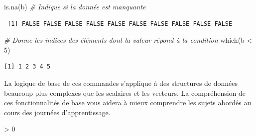 \documentclass[
  12pt,
]{book}
\newenvironment{Shaded}{\begin{snugshade}}{\end{snugshade}}
\newcommand{\CommentTok}[1]{\textcolor[rgb]{0.56,0.35,0.01}{\textit{#1}}}
\newcommand{\DecValTok}[1]{\textcolor[rgb]{0.00,0.00,0.81}{#1}}
\newcommand{\FunctionTok}[1]{\textcolor[rgb]{0.00,0.00,0.00}{#1}}
\newcommand{\NormalTok}[1]{#1}
\newcommand{\SpecialCharTok}[1]{\textcolor[rgb]{0.00,0.00,0.00}{#1}}
\newlength{\cslhangindent}
\newenvironment{CSLReferences}[2] %
 {%
  \setlength{\parindent}{0pt}
  \ifodd #1 \everypar{\setlength{\hangindent}{\cslhangindent}}\ignorespaces\fi
  \ifnum #2 > 0
  \setlength{\parskip}{#2\baselineskip}
  \fi
 }%
 {}
\begin{document}
\begin{Shaded}
\begin{Highlighting}[]
\FunctionTok{is.na}\NormalTok{(b) }\CommentTok{\# Indique si la donnée est manquante}
\end{Highlighting}
\end{Shaded}

\begin{verbatim}
 [1] FALSE FALSE FALSE FALSE FALSE FALSE FALSE FALSE FALSE FALSE
\end{verbatim}

\begin{Shaded}
\begin{Highlighting}[]
\CommentTok{\# Donne les indices des éléments dont la valeur répond à la condition}
\FunctionTok{which}\NormalTok{(b }\SpecialCharTok{\textless{}} \DecValTok{5}\NormalTok{)}
\end{Highlighting}
\end{Shaded}

\begin{verbatim}
[1] 1 2 3 4 5
\end{verbatim}

La logique de base de ces commandes s'applique à des structures de données beaucoup plus complexes que les scalaires et les vecteurs. La compréhension de ces fonctionnalités de base vous aidera à mieux comprendre les sujets abordés au cours des journées d'apprentissage.

\hypertarget{refs}{}
\begin{CSLReferences}{0}{0}
\end{CSLReferences}

\printbibliography
\end{document}
